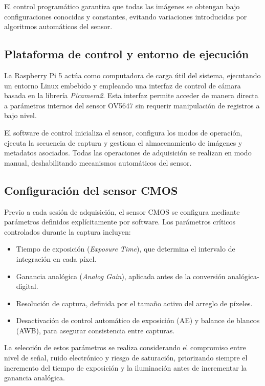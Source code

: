 El control programático garantiza que todas las imágenes se obtengan bajo configuraciones conocidas y constantes, evitando variaciones introducidas por algoritmos automáticos del sensor.

\subsection{Plataforma de control y entorno de ejecución}

La Raspberry Pi 5 actúa como computadora de carga útil del sistema, ejecutando un entorno Linux embebido y empleando una interfaz de control de cámara basada en la librería \textit{Picamera2}. Esta interfaz permite acceder de manera directa a parámetros internos del sensor OV5647 sin requerir manipulación de registros a bajo nivel.

El software de control inicializa el sensor, configura los modos de operación, ejecuta la secuencia de captura y gestiona el almacenamiento de imágenes y metadatos asociados. Todas las operaciones de adquisición se realizan en modo manual, deshabilitando mecanismos automáticos del sensor.

\subsection{Configuración del sensor CMOS}

Previo a cada sesión de adquisición, el sensor CMOS se configura mediante parámetros definidos explícitamente por software. Los parámetros críticos controlados durante la captura incluyen:

\begin{itemize}
    \item Tiempo de exposición (\textit{Exposure Time}), que determina el intervalo de integración en cada píxel.
    \item Ganancia analógica (\textit{Analog Gain}), aplicada antes de la conversión analógica-digital.
    \item Resolución de captura, definida por el tamaño activo del arreglo de píxeles.
    \item Desactivación de control automático de exposición (AE) y balance de blancos (AWB), para asegurar consistencia entre capturas.
\end{itemize}

La selección de estos parámetros se realiza considerando el compromiso entre nivel de señal, ruido electrónico y riesgo de saturación, priorizando siempre el incremento del tiempo de exposición y la iluminación antes de incrementar la ganancia analógica.

